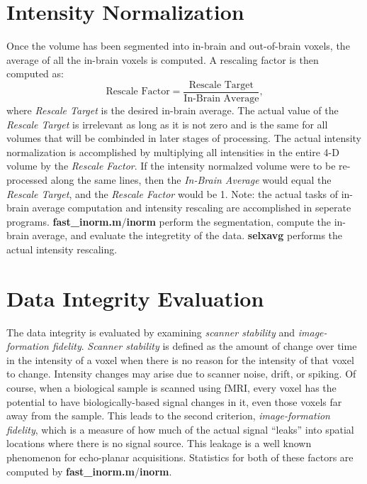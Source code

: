 \documentclass[10pt]{article}
\begin{document}
\section{Intensity Normalization}

Once the volume has been segmented into in-brain and out-of-brain
voxels, the average of all the in-brain voxels is computed.  A
rescaling factor is then computed as:
\begin{equation}
\text{Rescale Factor} = \frac{\text{Rescale Target}}{\text{In-Brain Average}},
\end{equation}
where {\em Rescale Target} is the desired in-brain average. The actual
value of the {\em Rescale Target} is irrelevant as long as it is not
zero and is the same for all volumes that will be combinded in later
stages of processing.  The actual intensity normalization is
accomplished by multiplying all intensities in the entire 4-D volume
by the {\em Rescale Factor}.  If the intensity normalzed volume were
to be re-processed along the same lines, then the {\em In-Brain
Average} would equal the {\em Rescale Target}, and the {\em Rescale
Factor} would be 1.  Note: the actual tasks of in-brain average
computation and intensity rescaling are accomplished in seperate
programs. {\bf fast\_inorm.m}/{\bf inorm} perform the segmentation,
compute the in-brain average, and evaluate the integretity of the
data. {\bf selxavg} performs the actual intensity rescaling.

\section{Data Integrity Evaluation}

The data integrity is evaluated by examining {\em scanner stability}
and {\em image-formation fidelity}. {\em Scanner stability} is defined
as the amount of change over time in the intensity of a voxel when
there is no reason for the intensity of that voxel to change.
Intensity changes may arise due to scanner noise, drift, or
spiking. Of course, when a biological sample is scanned using fMRI,
every voxel has the potential to have biologically-based signal
changes in it, even those voxels far away from the sample.  This leads
to the second criterion, {\em image-formation fidelity}, which is a
measure of how much of the actual signal ``leaks'' into spatial
locations where there is no signal source. This leakage is a well
known phenomenon for echo-planar acquisitions. Statistics for both of
these factors are computed by {\bf fast\_inorm.m}/{\bf inorm}.
\end{document}
